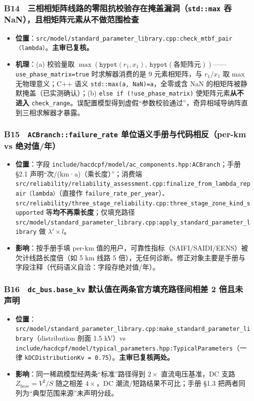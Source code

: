 \documentclass[11pt,a4paper,fontset=fandol]{ctexart}
\newcommand{\file}[1]{\texttt{#1}}
\begin{document}
\subsubsection*{B14　三相相矩阵线路的零阻抗校验存在掩盖漏洞（\texttt{std::max} 吞 NaN），且相矩阵元素从不做范围检查}
\begin{itemize}
  \item \textbf{位置}：\file{src/model/standard\_parameter\_library.cpp:check\_mtbf\_pair（lambda）}。\textbf{主审已复核。}
  \item \textbf{机理}：(a) 校验量取 $\max(\texttt{hypot}(r_1,x_1),\ \texttt{hypot}(\text{各矩阵元}))$——\texttt{use\_phase\_matrix=true} 时求解器消费的是 9 元素相矩阵，与 $r_1/x_1$ 取 max 无物理意义；C++ 语义 \texttt{std::max(a, NaN)=a}，全零或含 NaN 的相矩阵被静默掩盖（已实测确认）；(b) \texttt{else if (!use\_phase\_matrix)} 使矩阵元素\textbf{从不进入} \texttt{check\_range}。误配置模型得到虚假``参数校验通过''，奇异相域导纳阵直到三相求解器才暴露。
\end{itemize}

\subsubsection*{B15　\texttt{ACBranch::failure\_rate} 单位语义手册与代码相反（per-km vs 绝对值/年）}
\begin{itemize}
  \item \textbf{位置}：字段 \file{include/hacdcpf/model/ac\_components.hpp:ACBranch}；手册 \S 2.1 声明``次/(km·a)（乘长度）''；消费端 \file{src/reliability/reliability\_assessment.cpp:finalize\_from\_lambda\_repair（lambda）}（直接作 \texttt{failure\_rate\_per\_year}）、\file{src/reliability/three\_stage\_reliability.cpp:three\_stage\_zone\_kind\_supported} 等\textbf{均不再乘长度}；仅填充路径 \file{src/model/standard\_parameter\_library.cpp:apply\_standard\_parameter\_library} 做 $\lambda'\times l$。
  \item \textbf{影响}：按手册手填 per-km 值的用户，可靠性指标（SAIFI/SAIDI/EENS）被欠计线路长度倍（如 5 km 线路 5 倍），无任何诊断。修正对象主要是手册与字段注释（代码语义自洽：字段存绝对值/年）。
\end{itemize}

\subsubsection*{B16　\texttt{dc\_bus.base\_kv} 默认值在两条官方填充路径间相差 2 倍且未声明}
\begin{itemize}
  \item \textbf{位置}：\file{src/model/standard\_parameter\_library.cpp:make\_standard\_parameter\_library}（distribution 剖面 1.5 kV）vs \file{include/hacdcpf/model/typical\_parameters.hpp:TypicalParameters}（一律 \texttt{kDCDistributionKv = 0.75}）。\textbf{主审已复核两处。}
  \item \textbf{影响}：同一稀疏模型经两条``标准''路径得到 $2\times$ 直流电压基准，DC 支路 $Z_{base}=V^2/S$ 随之相差 $4\times$，DC 潮流/短路结果不可比；手册 \S 1.3 把两者同列为``典型范围来源''未声明分歧。
\end{itemize}
\end{document}
